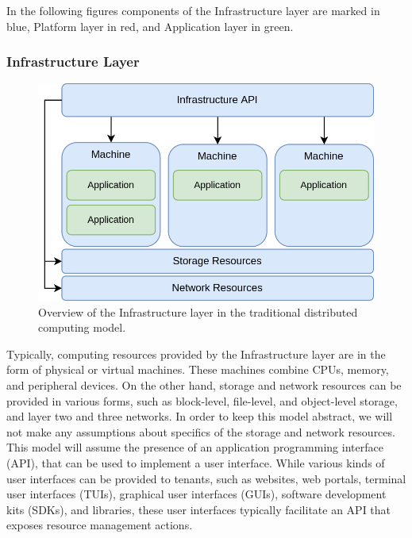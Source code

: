 In the following figures components of the Infrastructure layer are marked in
blue, Platform layer in red, and Application layer in green.

\subsubsection{Infrastructure Layer}

\begin{figure}[H]
  \centering
  \includegraphics[width=0.7\linewidth]{resources/distributed-computing-infrastructure-example.drawio.png}
  \caption{Overview of the Infrastructure layer in the traditional distributed computing model.}
  \label{fig:traditional-infrastructure-overview}
\end{figure}

Typically, computing resources provided by the Infrastructure layer are in the
form of physical or virtual machines. These machines combine CPUs, memory, and
peripheral devices. On the other hand, storage and network resources can be
provided in various forms, such as block-level, file-level, and object-level
storage, and layer two and three networks. In order to keep this model abstract,
we will not make any assumptions about specifics of the storage and network
resources. This model will assume the presence of an application programming
interface (API), that can be used to implement a user interface. While various
kinds of user interfaces can be provided to tenants, such as websites, web
portals, terminal user interfaces (TUIs), graphical user interfaces (GUIs),
software development kits (SDKs), and libraries, these user interfaces typically
facilitate an API that exposes resource management actions.

